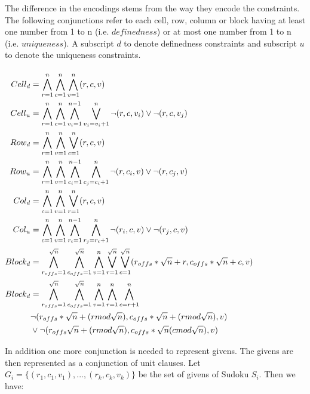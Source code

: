 \documentclass{article}
\begin{document}
The difference in the encodings stems from the way they encode the constraints. The following conjunctions refer to each cell, row, column or block having at least one number from 1 to n (i.e. $definedness$) or at most one number from 1 to n (i.e. $uniqueness$).
A subscript $d$ to denote definedness constraints and subscript $u$ to denote the uniqueness constraints. \\\\
$\begin{aligned}
Cell_{d} &= \bigwedge^{n}_{r=1}\bigwedge^{n}_{c=1}\bigwedge^{n}_{v=1} (r,c,v) &\\
Cell_{u} &= \bigwedge^{n}_{r=1}\bigwedge^{n}_{c=1}\bigwedge^{n-1}_{v_{i}=1} \bigvee^{n}_{v_{j}=v_{i}+1} \neg (r,c,v_{i}) \vee \neg (r,c,v_{j}) &\\
Row_{d} &= \bigwedge^{n}_{r=1}\bigwedge^{n}_{v=1}\bigvee^{n}_{c=1} (r,c,v) &\\
Row_{u} &= \bigwedge^{n}_{r=1}\bigwedge^{n}_{v=1}\bigwedge^{n-1}_{c_{i}=1} \bigwedge^{n}_{c_{j}=c_{i}+1} \neg (r,c_{i},v) \vee \neg (r,c_{j},v) &\\
Col_{d} &= \bigwedge^{n}_{c=1}\bigwedge^{n}_{v=1}\bigvee^{n}_{r=1} (r,c,v) &\\
Col_{u} &= \bigwedge^{n}_{c=1}\bigwedge^{n}_{v=1}\bigwedge^{n-1}_{r_{i}=1} \bigwedge^{n}_{r_{j}=r_{i}+1} \neg (r_{i},c,v) \vee \neg (r_{j},c,v) &\\
Block_{d} &= \bigwedge^{\sqrt{n}}_{r_{offs}=1}\bigwedge^{\sqrt{n}}_{c_{offs}=1}\bigwedge^{n}_{v=1}\bigvee_{r=1}^{\sqrt{n}}\bigvee_{c=1}^{\sqrt{n}}(r_{offs}*\sqrt{n}+r,c_{offs}*\sqrt{n}+c,v) &\\
Block_{d} &= \bigwedge^{\sqrt{n}}_{r_{offs}=1}\bigwedge^{\sqrt{n}}_{c_{offs}=1}\bigwedge^{n}_{v=1}\bigwedge_{r=1}^{n}\bigwedge_{c=r+1}^{n} &\\ & \neg (r_{offs}*\sqrt{n}+(r \space mod \sqrt{n}),c_{offs}*\sqrt{n}+(r \space mod \sqrt{n}),v) &\\
& \vee \neg (r_{offs}\sqrt{n}+(r \space mod \sqrt{n}),c_{offs}*\sqrt{n}(c \space mod \sqrt{n}),v)
\end{aligned}$

In addition one more conjunction is needed to represent givens. The givens are then represented as a conjunction of unit clauses.
Let $G_i=\{(r_1,c_1,v_1),...,(r_k,c_k,v_k)\}$ be the set of givens of Sudoku $S_i$. Then we have: \\
\end{document}
